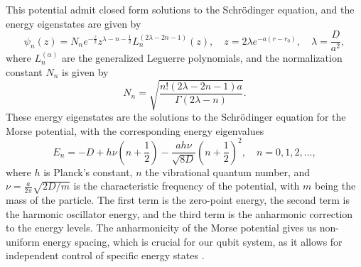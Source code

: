 \documentclass{subfiles}
\begin{document}
This potential admit closed form solutions to the Schrödinger equation, and the energy eigenstates are given by
\begin{equation}
    \psi_n(z) = N_n e^{-\frac{z}{2}}z^{\lambda - n - \frac{1}{2}}L_n^{(2\lambda - 2n - 1)}(z), \quad z = 2\lambda e^{-a(r-r_0)}, \quad \lambda = \frac{D}{a^2},\label{eq:morse_eigenstates}
\end{equation}
where $L_n^{(\alpha)}$ are the generalized Leguerre polynomials, and the normalization constant $N_n$ is given by
\begin{equation*}
    N_n = \sqrt{\frac{n! (2\lambda - 2n - 1)a}{\Gamma(2\lambda - n)}}.
\end{equation*}
These energy eigenstates are the solutions to the Schrödinger equation for the Morse potential, with the corresponding energy eigenvalues
\begin{equation}
    E_n = -D + h\nu(n + \frac{1}{2}) - \frac{ah\nu}{\sqrt{8D}}(n + \frac{1}{2})^2, \quad n = 0, 1, 2, ...\label{eq:morse_energy_levels},
\end{equation}
where $h$ is Planck's constant, $n$ the vibrational quantum number, and $\nu=\frac{a}{2\pi}\sqrt{2D / m}$ is the characteristic frequency of the potential, with $m$ being the mass of the particle. The first term is the zero-point energy, the second term is the harmonic oscillator energy, and the third term is the anharmonic correction to the energy levels. The anharmonicity of the Morse potential gives us non-uniform energy spacing, which is crucial for our qubit system, as it allows for independent control of specific energy states \cite{piela2006ideas, morse1929diatomic}.

\end{document}
